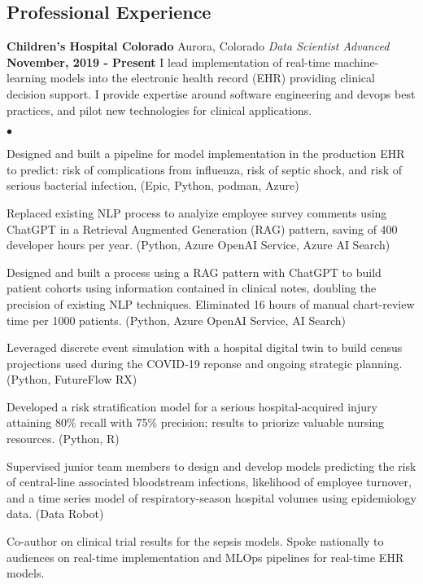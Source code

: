 \documentclass[margin,line, 11pt]{res}
\newenvironment{list2}{
  \begin{list}{$\bullet$}{%
      \setlength{\itemsep}{0in}
      \setlength{\parsep}{0in} \setlength{\parskip}{0in}
      \setlength{\topsep}{0in} \setlength{\partopsep}{0in}
      \setlength{\leftmargin}{0.2in}}}{\end{list}}
\begin{document}
\begin{resume}
\section{Professional \newline Experience}
\textbf{Children's Hospital Colorado} \hfill Aurora, Colorado\newline
\textit{Data Scientist Advanced} \hfill \textbf{November, 2019 - Present}\newline
I lead implementation of real-time machine-learning models into the electronic health record (EHR) providing clinical decision support. I provide expertise around software engineering and devops best practices, and pilot new technologies for clinical applications.
    \begin{list2}
      \item Designed and built a pipeline for model implementation in the production EHR to predict: risk of complications from influenza, risk of septic shock, and risk of serious bacterial infection, (Epic, Python, podman, Azure)
      \item Replaced existing NLP process to analyize employee survey comments using ChatGPT in a Retrieval Augmented Generation (RAG) pattern, saving of 400 developer hours per year. (Python, Azure OpenAI Service, Azure AI Search)
      \item Designed and built a process using a RAG pattern with ChatGPT to build patient cohorts using information contained in clinical notes, doubling the precision of existing NLP techniques. Eliminated 16 hours of manual chart-review time per 1000 patients. (Python, Azure OpenAI Service, AI Search)
      \item Leveraged discrete event simulation with a hospital digital twin to build census projections used during the COVID‑19 reponse and ongoing strategic planning. (Python, FutureFlow RX)
      \item Developed a risk stratification model for a serious hospital-acquired injury attaining 80\% recall with 75\% precision; results to priorize valuable nursing resources. (Python, R)
      \item Supervised junior team members to design and develop models predicting the risk of central-line associated bloodstream infections, likelihood of employee turnover, and a time series model of respiratory-season hospital volumes using epidemiology data. (Data Robot)
      \item Co-author on clinical trial results for the sepsis models. Spoke nationally to audiences on real-time implementation and MLOps pipelines for real-time EHR models.
    \end{list2}
\vspace*{-2mm}


\end{resume}
\end{document}

